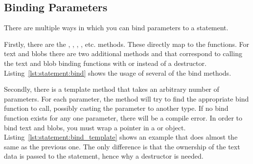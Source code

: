 
\subsection{Binding Parameters}
\label{section:statement:bind}

There are multiple ways in which you can bind parameters to a statement.

Firstly, there are the , , , , etc. methods. These directly map to the  functions. For text and blobs there are two additional methods  and  that correspond to calling the text and blob binding functions with  or  instead of a destructor. Listing~\ref{lst:statement:bind} shows the usage of several of the bind methods.



Secondly, there is a template  method that takes an arbitrary number of parameters. For each parameter, the method will try to find the appropriate bind function to call, possibly casting the parameter to another type. If no bind function exists for any one parameter, there will be a compile error. In order to bind text and blobs, you must wrap a pointer in a  or  object. Listing~\ref{lst:statement:bind_template} shows an example that does almost the same as the previous one. The only difference is that the ownership of the text data is passed to the statement, hence why a destructor is needed.



